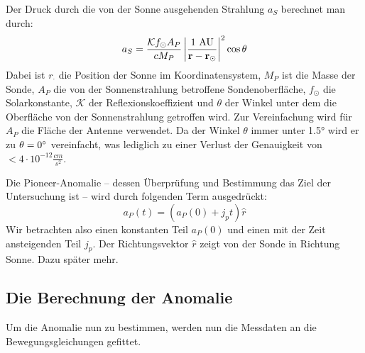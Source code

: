 Der Druck durch die von der Sonne ausgehenden Strahlung $a_S$ berechnet man durch:
\begin{equation}
a_S = \frac{\mathcal{K}f_\odot A_P}{c M_P} \left| \frac{1\ \mathrm{AU}}{\bf{r}-\bf{r_\odot}} \right|^2 \cos\theta
\end{equation}
Dabei ist $r_\cdot$ die Position der Sonne im Koordinatensystem, $M_P$ ist die Masse der Sonde, $A_P$ die von der Sonnenstrahlung betroffene Sondenoberfläche, $f_\odot$ die Solarkonstante, $\mathcal{K}$ der Reflexionskoeffizient und $\theta$ der Winkel unter dem die Oberfläche von der Sonnenstrahlung getroffen wird.
Zur Vereinfachung wird für $A_P$ die Fläche der Antenne verwendet.
Da der Winkel $\theta$ immer unter 1.5° wird er zu $\theta = 0\degree$ vereinfacht, was lediglich zu einer Verlust der Genauigkeit von $< 4 \cdot 10^{-12} \frac{cm}{s^2}$.\cite{Markwardt2002}

Die Pioneer-Anomalie – dessen Überprüfung und Bestimmung das Ziel der Untersuchung ist – wird durch folgenden Term ausgedrückt:
\begin{equation}
a_P(t) = \left( a_P(0) + j_pt\right)\hat{r}
\end{equation}
Wir betrachten also einen konstanten Teil $a_P(0)$ und einen mit der Zeit ansteigenden Teil $j_p$. Der Richtungsvektor $\hat{r}$ zeigt von der Sonde in Richtung Sonne. Dazu später mehr.


\subsection{Die Berechnung der Anomalie}
Um die Anomalie nun zu bestimmen, werden nun die Messdaten an die Bewegungsgleichungen gefittet. 

























